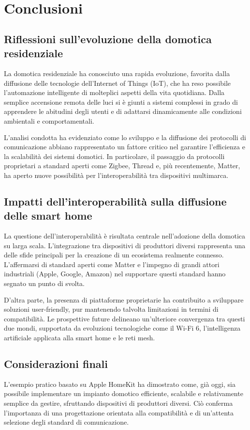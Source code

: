 \chapter{Conclusioni}
\section{Riflessioni sull’evoluzione della domotica residenziale}
La domotica residenziale ha conosciuto una rapida evoluzione, favorita dalla diffusione delle tecnologie dell’Internet of Things (IoT), che ha reso possibile l’automazione intelligente di molteplici aspetti della vita quotidiana. Dalla semplice accensione remota delle luci si è giunti a sistemi complessi in grado di apprendere le abitudini degli utenti e di adattarsi dinamicamente alle condizioni ambientali e comportamentali.

L’analisi condotta ha evidenziato come lo sviluppo e la diffusione dei protocolli di comunicazione abbiano rappresentato un fattore critico nel garantire l’efficienza e la scalabilità dei sistemi domotici. In particolare, il passaggio da protocolli proprietari a standard aperti come Zigbee, Thread e, più recentemente, Matter, ha aperto nuove possibilità per l’interoperabilità tra dispositivi multimarca.

\section{Impatti dell’interoperabilità sulla diffusione delle smart home}
La questione dell’interoperabilità è risultata centrale nell’adozione della domotica su larga scala. L’integrazione tra dispositivi di produttori diversi rappresenta una delle sfide principali per la creazione di un ecosistema realmente connesso. L’affermarsi di standard aperti come Matter e l’impegno di grandi attori industriali (Apple, Google, Amazon) nel supportare questi standard hanno segnato un punto di svolta.

D’altra parte, la presenza di piattaforme proprietarie ha contribuito a sviluppare soluzioni user-friendly, pur mantenendo talvolta limitazioni in termini di compatibilità. Le prospettive future delineano un’ulteriore convergenza tra questi due mondi, supportata da evoluzioni tecnologiche come il Wi-Fi 6, l’intelligenza artificiale applicata alla smart home e le reti mesh.

\section{Considerazioni finali}
L’esempio pratico basato su Apple HomeKit ha dimostrato come, già oggi, sia possibile implementare un impianto domotico efficiente, scalabile e relativamente semplice da gestire, sfruttando dispositivi di produttori diversi. Ciò conferma l’importanza di una progettazione orientata alla compatibilità e di un’attenta selezione degli standard di comunicazione.


